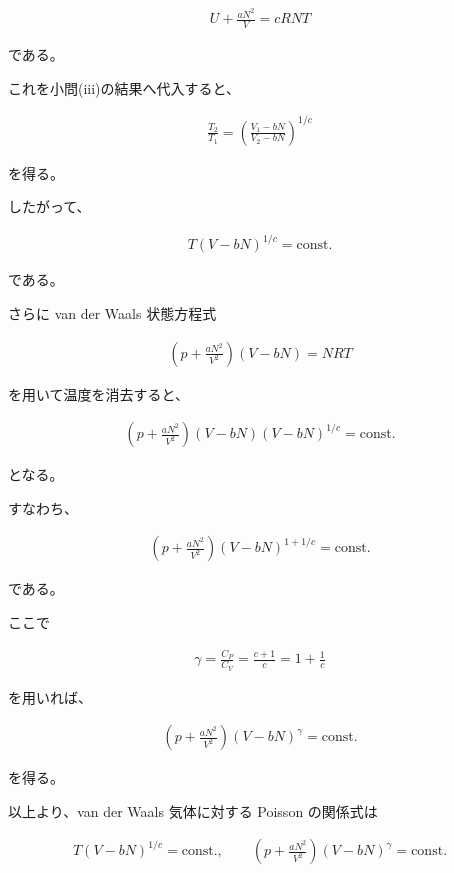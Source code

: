 \documentclass[platex,dvipdfmx,a4paper]{jsarticle}
\begin{document}
\begin{align*}
U+\frac{aN^2}{V}
=
cRNT
\end{align*}

である。

これを小問(iii)の結果へ代入すると、

\begin{align*}
\frac{T_2}{T_1}
=
\left(
\frac{V_1-bN}{V_2-bN}
\right)^{1/c}
\end{align*}

を得る。

したがって、

\begin{align*}
T(V-bN)^{1/c}
=
\mathrm{const.}
\end{align*}

である。

さらに van der Waals 状態方程式

\begin{align*}
\left(
p+\frac{aN^2}{V^2}
\right)
(V-bN)
=
NRT
\end{align*}

を用いて温度を消去すると、

\begin{align*}
\left(
p+\frac{aN^2}{V^2}
\right)
(V-bN)
(V-bN)^{1/c}
=
\mathrm{const.}
\end{align*}

となる。

すなわち、

\begin{align*}
\left(
p+\frac{aN^2}{V^2}
\right)
(V-bN)^{1+1/c}
=
\mathrm{const.}
\end{align*}

である。

ここで

\begin{align*}
\gamma
=
\frac{C_P}{C_V}
=
\frac{c+1}{c}
=
1+\frac1c
\end{align*}

を用いれば、

\begin{align*}
\left(
p+\frac{aN^2}{V^2}
\right)
(V-bN)^\gamma
=
\mathrm{const.}
\end{align*}

を得る。

以上より、van der Waals 気体に対する Poisson の関係式は

\begin{align*}
T(V-bN)^{1/c}
=
\mathrm{const.},
\qquad
\left(
p+\frac{aN^2}{V^2}
\right)
(V-bN)^\gamma
=
\mathrm{const.}
\end{align*}
\end{document}
